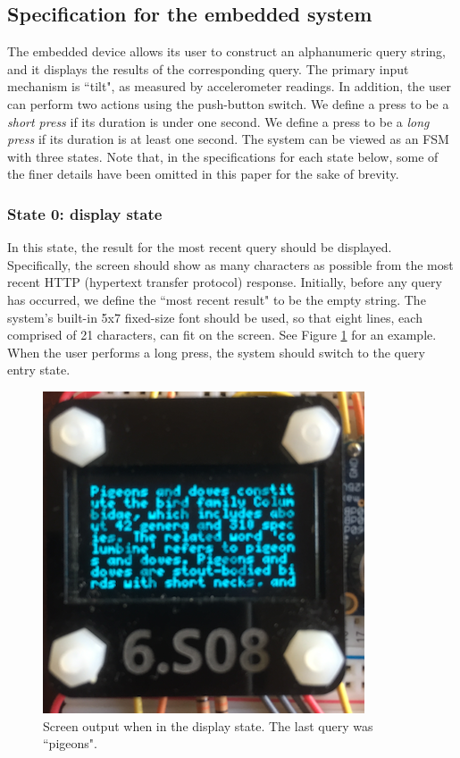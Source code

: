\documentclass[12pt]{article}
\begin{document}
\subsection{Specification for the embedded system}
The embedded device allows its user to construct an alphanumeric query string, and it displays the results of the corresponding query.  The primary input mechanism is ``tilt", as measured by accelerometer readings.  In addition, the user can perform two actions using the push-button switch.  We define a press to be a \textit{short press} if its duration is under one second.  We define a press to be a \textit{long press} if its duration is at least one second.  The system can be viewed as an FSM with three states.  Note that, in the specifications for each state below, some of the finer details have been omitted in this paper for the sake of brevity.

\subsubsection{State 0: display state}
In this state, the result for the most recent query should be displayed.  Specifically, the screen should show as many characters as possible from the most recent HTTP (hypertext transfer protocol) response.  Initially, before any query has occurred, we define the ``most recent result" to be the empty string.  The system's built-in 5x7 fixed-size font should be used, so that eight lines, each comprised of 21 characters, can fit on the screen.  See Figure \ref{fig:pigeons} for an example.  When the user performs a long press, the system should switch to the query entry state.

\begin{figure}[t]
\centering
\includegraphics[width=0.5\linewidth]{text-wiki-close.png}
\vspace{5mm}
\caption{Screen output when in the display state. The last query was ``pigeons".}
\label{fig:pigeons}
\end{figure}
\end{document}
